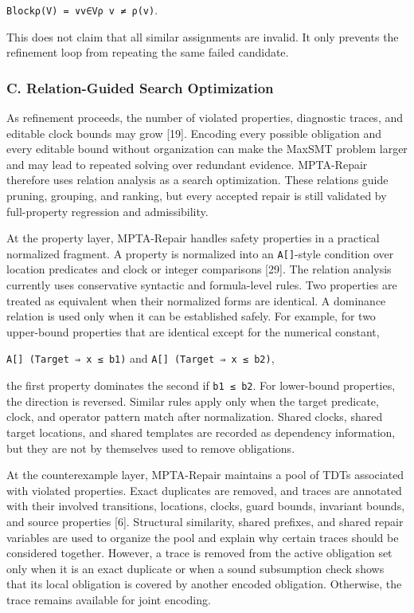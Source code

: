 \documentclass[
]{article}
\begin{document}
\texttt{Blockρ(V)\ =\ ∨v∈Vρ\ v\ ≠\ ρ(v)}.

This does not claim that all similar assignments are invalid. It only
prevents the refinement loop from repeating the same failed candidate.

\subsubsection{C. Relation-Guided Search
Optimization}\label{c.-relation-guided-search-optimization}

As refinement proceeds, the number of violated properties, diagnostic
traces, and editable clock bounds may grow {[}19{]}. Encoding every
possible obligation and every editable bound without organization can
make the MaxSMT problem larger and may lead to repeated solving over
redundant evidence. MPTA-Repair therefore uses relation analysis as a
search optimization. These relations guide pruning, grouping, and
ranking, but every accepted repair is still validated by full-property
regression and admissibility.

At the property layer, MPTA-Repair handles safety properties in a
practical normalized fragment. A property is normalized into an
\texttt{A{[}{]}}-style condition over location predicates and clock or
integer comparisons {[}29{]}. The relation analysis currently uses
conservative syntactic and formula-level rules. Two properties are
treated as equivalent when their normalized forms are identical. A
dominance relation is used only when it can be established safely. For
example, for two upper-bound properties that are identical except for
the numerical constant,

\texttt{A{[}{]}\ (Target\ ⇒\ x\ ≤\ b1)} and
\texttt{A{[}{]}\ (Target\ ⇒\ x\ ≤\ b2)},

the first property dominates the second if \texttt{b1\ ≤\ b2}. For
lower-bound properties, the direction is reversed. Similar rules apply
only when the target predicate, clock, and operator pattern match after
normalization. Shared clocks, shared target locations, and shared
templates are recorded as dependency information, but they are not by
themselves used to remove obligations.

At the counterexample layer, MPTA-Repair maintains a pool of TDTs
associated with violated properties. Exact duplicates are removed, and
traces are annotated with their involved transitions, locations, clocks,
guard bounds, invariant bounds, and source properties {[}6{]}.
Structural similarity, shared prefixes, and shared repair variables are
used to organize the pool and explain why certain traces should be
considered together. However, a trace is removed from the active
obligation set only when it is an exact duplicate or when a sound
subsumption check shows that its local obligation is covered by another
encoded obligation. Otherwise, the trace remains available for joint
encoding.
\end{document}
